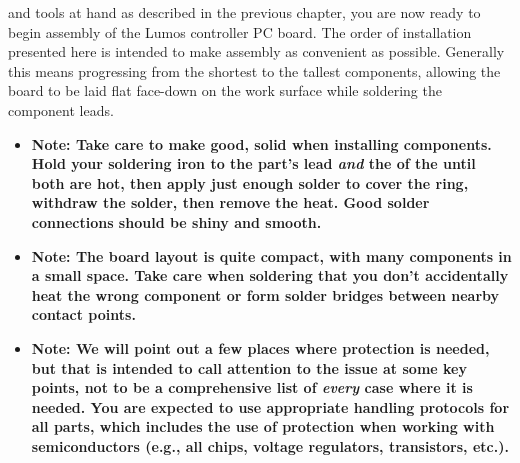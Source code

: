  and tools at hand as described in the previous chapter, you
are now ready to begin assembly of the Lumos controller PC board.  The order of installation
presented here is intended to make assembly as convenient as possible.  Generally this means
progressing from the shortest to the tallest components, allowing the board to be laid flat
face-down on the work surface while soldering the component leads.

\begin{itemize}
\item[\HandRight] \bfseries{Note:} 
Take care to make good, solid  when installing components.
Hold your soldering iron to the part's lead \emph{and} the  of the 
until both are hot, then apply just enough solder to cover the ring, withdraw the solder, then 
remove the heat.  Good solder connections should be shiny and smooth.

\item[\HandRight] \bfseries{Note:} 
The board layout is quite compact, with many components in a small space.  Take
care when soldering that you don't accidentally heat the wrong component or form solder bridges between
nearby contact points.

\item[\HandRight] \bfseries{Note:} 
We will point out a few places where  protection is needed, but
that is intended to call attention to the issue at some key points, not to be a comprehensive list of
\emph{every} case where it is needed.  You are expected to use appropriate handling protocols for all
parts, which includes the use of  protection when working with semiconductors (e.g., all
chips, voltage regulators, transistors, etc.).
\end{itemize}

